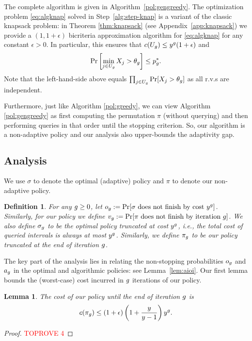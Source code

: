 \documentclass[11pt]{article}
\newcommand{\base}{y}
\newtheorem{lem}[thm]{Lemma}
\newtheorem{defn}[thm]{Definition}
\theoremstyle{remark}
\theoremstyle{plain}
\theoremstyle{remark}
\begin{document}
The complete algorithm is given in Algorithm~\ref{pol:gengreedy}. 
The optimization problem \eqref{eq:algknap} solved in Step~\ref{alg:step-knap} is a variant of the classic knapsack problem: in Theorem \ref{thm:knapsack} (see Appendix~\ref{app:knapsack}) we provide a  $(1,1+\epsilon)$ bicriteria approximation algorithm for \eqref{eq:algknap} for any constant $\epsilon>0$. In particular, this ensures that $c(U_\i) \leq \base^\i(1+\epsilon)$ and 
$$ \Pr\left[\min_{j \in U_g} X_j  > \theta_g\right] \leq p^*_g .$$ Note that the left-hand-side above equals $\prod_{j \in U_g}\Pr[ X_j  > \theta_g]$ as all r.v.s are independent. 

Furthermore, just like Algorithm \ref{pol:greedy}, we can view   Algorithm \ref{pol:gengreedy} as first computing the permutation $\pi$ (without querying) and then performing  queries in that order until the stopping criterion. So, our algorithm is a non-adaptive policy and our analysis also upper-bounds the adaptivity gap. 
 
\subsection{Analysis}
 We use  $\sigma$ to denote the optimal (adaptive) policy and $\pi$ to denote our non-adaptive policy. 
 
 \begin{defn}
\label{def:ai}
    For any $g \ge 0$, let $ o_\i := \Pr[ \sigma \text{ does not finish by cost }\base^\i]$. 
    Similarly, for our policy we define $v_g := \Pr[\pi \text{ does not finish by iteration }g]$.   
We also define $\sigma_g$ to be the optimal policy truncated at cost $\base^\i$, i.e., the total cost of queried intervals is always at most $\base^\i$. Similarly, we define $\pi_g$ to be our policy truncated at the end of iteration $g$.
\end{defn}

The key part of the analysis lies in relating the non-stopping probabilities $o_g$ and $a_g$ in the optimal and algorithmic policies: see Lemma~\ref{lem:aioi}. Our first lemma  bounds the (worst-case) cost incurred in $g$ iterations of our policy.



\begin{lem}
\label{lem:grdup}The cost of our policy until the end of iteration $g$  is
   \[c(\pi_\i)  \leq (1 + \epsilon) \left(1 + \dfrac{\base}{\base - 1}  \right)\base^\i. \]
\end{lem}
\begin{proof}\textcolor{red}{TOPROVE 4}\end{proof}
\end{document}
